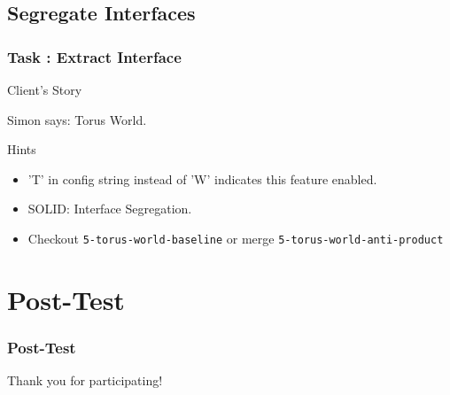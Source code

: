 \documentclass[english]{beamer}
\newenvironment{narrowblock}[1]{%
\begin{center}
\begin{minipage}{10.5cm}
\begin{block}{#1}
}{%
\end{block}
\end{minipage}
\end{center}
}
\begin{document}
\subsection{Segregate Interfaces}

\begin{frame}
\frametitle{Task \thesubsection: Extract Interface}

\begin{narrowblock}{Client's Story}
Simon says: Torus World.
\end{narrowblock}

\pause
\begin{narrowblock}{Hints}
\begin{itemize}[<+->]
\item 'T' in config string instead of 'W' indicates this feature enabled.
\item SOLID: Interface Segregation.
\item Checkout \texttt{5-torus-world-baseline} or merge \texttt{5-torus-world-anti-product}
\end{itemize}
\end{narrowblock}
\end{frame}

\section{Post-Test}
\begin{frame}
\frametitle{Post-Test}
\end{frame}

\begin{frame}
\begin{center}
Thank you for participating!
\end{center}
\end{frame}
\end{document}
